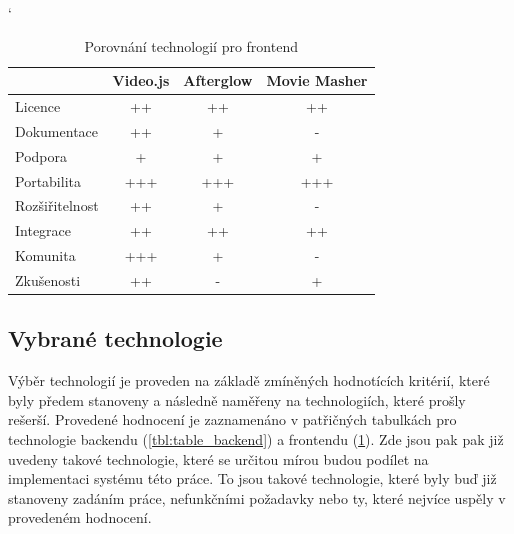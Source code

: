 \documentclass[thesis=M,czech]{FITthesis}[2012/06/26]
\begin{document}
\begin{table}[]
\catcode` %
\centering
\begin{tabular}{l|l|l|l|}
\cline{2-4}
\multicolumn{1}{c|}{}                 & \multicolumn{1}{c|}{Video.js} & \multicolumn{1}{c|}{Afterglow} & \multicolumn{1}{c|}{Movie Masher} \\ \hline
\multicolumn{1}{|l|}{Licence}        & \multicolumn{1}{c|}{++}      & \multicolumn{1}{c|}{++}        & \multicolumn{1}{c|}{++}         \\ \hline
\multicolumn{1}{|l|}{Dokumentace}    & \multicolumn{1}{c|}{++}      & \multicolumn{1}{c|}{+}         & \multicolumn{1}{c|}{-}                                      \\ \hline
\multicolumn{1}{|l|}{Podpora}        & \multicolumn{1}{c|}{+}       & \multicolumn{1}{c|}{+}         & \multicolumn{1}{c|}{+}                                      \\ \hline
\multicolumn{1}{|l|}{Portabilita}    & \multicolumn{1}{c|}{+++}     & \multicolumn{1}{c|}{+++}       & \multicolumn{1}{c|}{+++}                                    \\ \hline
\multicolumn{1}{|l|}{Rozšiřitelnost} & \multicolumn{1}{c|}{++}      & \multicolumn{1}{c|}{+}         & \multicolumn{1}{c|}{-}                                      \\ \hline
\multicolumn{1}{|l|}{Integrace}      & \multicolumn{1}{c|}{++}      & \multicolumn{1}{c|}{++}        & \multicolumn{1}{c|}{++}                                      \\ \hline
\multicolumn{1}{|l|}{Komunita}       & \multicolumn{1}{c|}{+++}     & \multicolumn{1}{c|}{+}         & \multicolumn{1}{c|}{-}                                      \\ \hline
\multicolumn{1}{|l|}{Zkušenosti}     & \multicolumn{1}{c|}{++}      & \multicolumn{1}{c|}{-}         & \multicolumn{1}{c|}{+}                                      \\ \hline
\end{tabular}
\caption{Porovnání technologií pro frontend}
\label{tbl:table_frontend}
\end{table}


\subsection{Vybrané technologie} \label{subsec:analyza_technologie_vybrane}

Výběr technologií je proveden na základě zmíněných hodnotících kritérií, které byly předem stanoveny a následně naměřeny na technologiích, které prošly rešerší. Provedené hodnocení je zaznamenáno v patřičných tabulkách pro technologie backendu (\ref{tbl:table_backend}) a frontendu (\ref{tbl:table_frontend}). Zde jsou pak pak již uvedeny takové technologie, které se určitou mírou budou podílet na implementaci systému této práce. To jsou takové technologie, které byly buď již stanoveny zadáním práce, nefunkčními požadavky nebo ty, které nejvíce uspěly v provedeném hodnocení.
	
\end{document}
